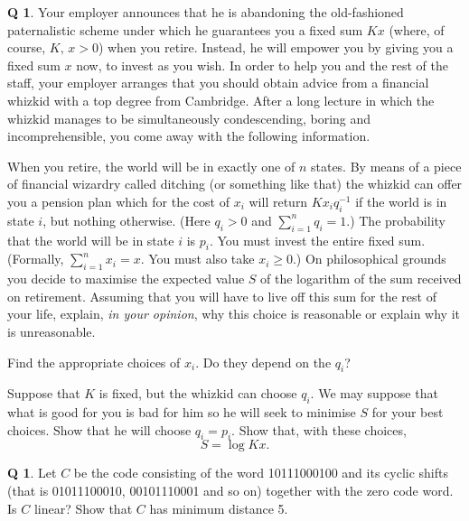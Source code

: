 \documentclass[12pt,a4paper]{article}
\theoremstyle{plain}
\theoremstyle{definition}
\newtheorem{question}[theorem]{Q}
\begin{document}
    \begin{question}
        \label{C2.9} Your employer announces that he is
        abandoning the old-fashioned paternalistic scheme
        under which he guarantees you a fixed sum $Kx$
        (where, of course, $K,\,x>0$)
        when you retire. Instead, he will empower you by
        giving you a fixed sum $x$ now, to invest as you wish.
        In order to help you
        and the rest of the staff, your employer
        arranges that you should obtain advice
        from a financial whizkid with a top degree
        from Cambridge. After a long lecture in which the whizkid
        manages to be simultaneously condescending, boring
        and incomprehensible, you come away with the following information.

        When you retire, the world will be in exactly
        one of $n$ states. By means of a piece of financial
        wizardry called ditching (or something like that)
        the whizkid can offer you a pension plan which
        for the cost of $x_{i}$ will return $Kx_{i}q_{i}^{-1}$
        if the world is in state $i$, but nothing otherwise.
        (Here  $q_{i}> 0$ and $\sum_{i=1}^{n}q_{i}=1$.)
        The probability that the world will be in state $i$
        is $p_{i}$. You must invest the entire fixed
        sum. (Formally, $\sum_{i=1}^{n}x_{i}=x$. You must also take
        $x_{i}\geq 0$.) On philosophical grounds you decide
        to maximise the expected value $S$ of the logarithm
        of the sum received on retirement.
        Assuming that you will have to live
        off this sum for the rest of your life,
        explain, \emph{in your opinion}, why this choice is
        reasonable or explain why it is unreasonable.

        Find the appropriate choices of $x_{i}$.
        Do they depend on the $q_{i}$?

        Suppose that $K$ is fixed, but the whizkid can choose
        $q_{i}$. We may suppose that what is good for you is bad for him
        so
        he will seek to minimise $S$ for your best choices.
        Show that he will choose $q_{i}=p_{i}$.
        Show that,
        with these choices,
        \[S=\log Kx.\]
    \end{question}
    \begin{question}
        \label{C2.10}
        Let $C$ be the code consisting of the
        word 10111000100 and its cyclic shifts (that is
        01011100010, 00101110001 and so on) together with
        the zero code word. Is $C$ linear? Show that $C$
        has minimum distance 5.
    \end{question}
\end{document}
